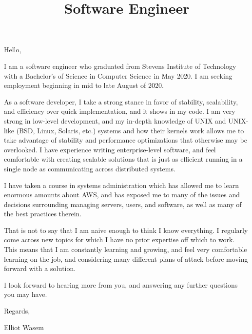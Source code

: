 \documentclass[12pt,letterpaper,roman]{moderncv}
\title{Software Engineer}
\begin{document}
\maketitle{}

\sethintscolumntowidth{\ }
Hello,\bigskip

I am a software engineer who graduated from Stevens Institute of Technology with
a Bachelor's of Science in Computer Science in May 2020. I am seeking employment
beginning in mid to late August of 2020.\bigskip

As a software developer, I take a strong stance in favor of stability,
scalability, and efficiency over quick implementation, and it shows in my
code. I am very strong in low-level development, and my in-depth knowledge
of UNIX and UNIX-like (BSD, Linux, Solaris, etc.) systems and how their kernels
work allows me to take advantage of stability and performance optimizations that
otherwise may be overlooked. I have experience writing enterprise-level
software, and feel comfortable with creating scalable solutions that is just as
efficient running in a single node as communicating across distributed
systems.\bigskip

I have taken a course in systems administration which has allowed me to learn
enormous amounts about AWS, and has exposed me to many of the issues and
decisions surrounding managing servers, users, and software, as well as many of
the best practices therein.\bigskip

That is not to say that I am naive enough to think I know everything. I
regularly come across new topics for which I have no prior expertise off which
to work. This means that I am constantly learning and growing, and feel very
comfortable learning on the job, and considering many different plans of attack
before moving forward with a solution.\bigskip

I look forward to hearing more from you, and answering any further questions you
may have.\bigskip

Regards,

Elliot Wasem
\end{document}
